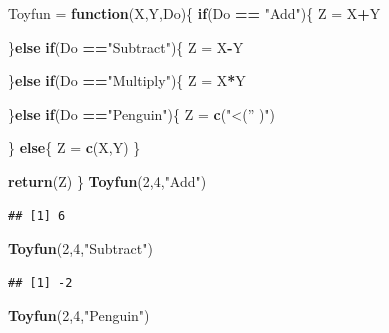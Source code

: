 \documentclass[
]{book}
\newenvironment{Shaded}{\begin{snugshade}}{\end{snugshade}}
\newcommand{\ControlFlowTok}[1]{\textcolor[rgb]{0.13,0.29,0.53}{\textbf{#1}}}
\newcommand{\DecValTok}[1]{\textcolor[rgb]{0.00,0.00,0.81}{#1}}
\newcommand{\KeywordTok}[1]{\textcolor[rgb]{0.13,0.29,0.53}{\textbf{#1}}}
\newcommand{\NormalTok}[1]{#1}
\newcommand{\OperatorTok}[1]{\textcolor[rgb]{0.81,0.36,0.00}{\textbf{#1}}}
\newcommand{\StringTok}[1]{\textcolor[rgb]{0.31,0.60,0.02}{#1}}
\begin{document}
\begin{Shaded}
\begin{Highlighting}[]
\NormalTok{Toyfun =}\StringTok{ }\ControlFlowTok{function}\NormalTok{(X,Y,Do)\{}
  \ControlFlowTok{if}\NormalTok{(Do }\OperatorTok{==}\StringTok{ "Add"}\NormalTok{)\{}
\NormalTok{    Z =}\StringTok{ }\NormalTok{X}\OperatorTok{+}\NormalTok{Y}

\NormalTok{  \}}\ControlFlowTok{else} \ControlFlowTok{if}\NormalTok{(Do }\OperatorTok{==}\StringTok{"Subtract"}\NormalTok{)\{}
\NormalTok{    Z =}\StringTok{ }\NormalTok{X}\OperatorTok{-}\NormalTok{Y}

\NormalTok{  \}}\ControlFlowTok{else} \ControlFlowTok{if}\NormalTok{(Do }\OperatorTok{==}\StringTok{"Multiply"}\NormalTok{)\{}
\NormalTok{    Z =}\StringTok{ }\NormalTok{X}\OperatorTok{*}\NormalTok{Y}

    
\NormalTok{  \}}\ControlFlowTok{else} \ControlFlowTok{if}\NormalTok{(Do }\OperatorTok{==}\StringTok{"Penguin"}\NormalTok{)\{}
\NormalTok{    Z =}\StringTok{ }\KeywordTok{c}\NormalTok{(}\StringTok{"<('' )"}\NormalTok{)}
    
\NormalTok{  \} }\ControlFlowTok{else}\NormalTok{\{}
\NormalTok{    Z =}\StringTok{ }\KeywordTok{c}\NormalTok{(X,Y)}
\NormalTok{  \}}
  
  \KeywordTok{return}\NormalTok{(Z)}
\NormalTok{\}}
\KeywordTok{Toyfun}\NormalTok{(}\DecValTok{2}\NormalTok{,}\DecValTok{4}\NormalTok{,}\StringTok{"Add"}\NormalTok{)}
\end{Highlighting}
\end{Shaded}

\begin{verbatim}
## [1] 6
\end{verbatim}

\begin{Shaded}
\begin{Highlighting}[]
\KeywordTok{Toyfun}\NormalTok{(}\DecValTok{2}\NormalTok{,}\DecValTok{4}\NormalTok{,}\StringTok{"Subtract"}\NormalTok{)}
\end{Highlighting}
\end{Shaded}

\begin{verbatim}
## [1] -2
\end{verbatim}

\begin{Shaded}
\begin{Highlighting}[]
\KeywordTok{Toyfun}\NormalTok{(}\DecValTok{2}\NormalTok{,}\DecValTok{4}\NormalTok{,}\StringTok{"Penguin"}\NormalTok{)}
\end{Highlighting}
\end{Shaded}
\end{document}
